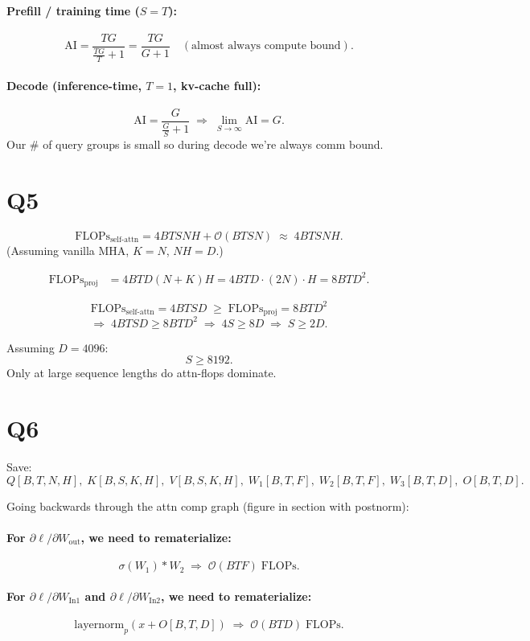 \documentclass[11pt]{article}
\newcommand{\flops}{\text{FLOPs}}
\begin{document}
\paragraph{Prefill / training time ($S = T$):}
\[
\text{AI} = \frac{TG}{\tfrac{TG}{T} + 1} = \frac{TG}{G + 1} \quad (\text{almost always compute bound}).
\]

\paragraph{Decode (inference-time, $T = 1$, kv-cache full):}
\[
\text{AI} = \frac{G}{\tfrac{G}{S} + 1} \;\Rightarrow\; \lim_{S \to \infty} \text{AI} = G.
\]
Our \# of query groups is small so during decode we're always comm bound.

\section*{Q5}

\[
\flops_{\text{self-attn}} = 4BTSNH + \mathcal{O}(BTSN) \;\approx\; 4BTSNH.
\]
(Assuming vanilla MHA, $K = N$, $NH = D$.)

\begin{align*}
\flops_{\text{proj}} &= 4BTD(N + K)H = 4BTD \cdot (2N) \cdot H = 8BTD^2.
\end{align*}

\[
\flops_{\text{self-attn}} = 4BTSD \;\geq\; \flops_{\text{proj}} = 8BTD^2
\]
\[
\Rightarrow\; 4BTSD \geq 8BTD^2 \;\Rightarrow\; 4S \geq 8D \;\Rightarrow\; S \geq 2D.
\]

Assuming $D = 4096$:
\[
S \geq 8192.
\]
Only at large sequence lengths do attn-flops dominate.

\section*{Q6}

Save:
\[
Q[B,T,N,H],\; K[B,S,K,H],\; V[B,S,K,H],\; W_1[B,T,F],\; W_2[B,T,F],\; W_3[B,T,D],\; O[B,T,D].
\]

Going backwards through the attn comp graph (figure in section with postnorm):

\paragraph{For $\partial \ell / \partial W_{\text{out}}$, we need to rematerialize:}
\[
\sigma(W_1) * W_2 \;\Rightarrow\; \mathcal{O}(BTF) \;\flops.
\]

\paragraph{For $\partial \ell / \partial W_{\text{In1}}$ and $\partial \ell / \partial W_{\text{In2}}$, we need to rematerialize:}
\[
\text{layernorm}_p(x + O[B, T, D]) \;\Rightarrow\; \mathcal{O}(BTD) \;\flops.
\]
\end{document}
